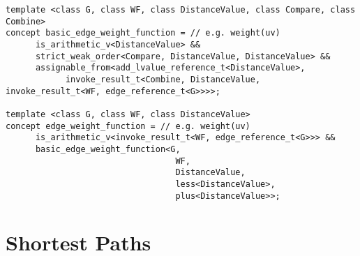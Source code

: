 
\begin{lstlisting}
template <class G, class WF, class DistanceValue, class Compare, class Combine>
concept basic_edge_weight_function = // e.g. weight(uv)
      is_arithmetic_v<DistanceValue> && 
      strict_weak_order<Compare, DistanceValue, DistanceValue> &&
      assignable_from<add_lvalue_reference_t<DistanceValue>,
            invoke_result_t<Combine, DistanceValue, invoke_result_t<WF, edge_reference_t<G>>>>;

template <class G, class WF, class DistanceValue>
concept edge_weight_function = // e.g. weight(uv)
      is_arithmetic_v<invoke_result_t<WF, edge_reference_t<G>>> &&
      basic_edge_weight_function<G,
                                  WF,
                                  DistanceValue,
                                  less<DistanceValue>,
                                  plus<DistanceValue>>;
\end{lstlisting}

\begin{comment}
      \phil{Queueable isn't being used.}
      \begin{lstlisting}
      // queueableQ can represent std::queue and std::priority\_queue
      template <class Q>
      concept queueable = requires(Q&& q, Q::value_type value) {
      Q::value_type;
      Q::size_type;
      Q::reference;

      {q.top()};
      {q.push(value)};
      {q.pop()};
      {q.empty()};
      {q.size()};
      };
      \end{lstlisting}
\end{comment}



\section{Shortest Paths}



